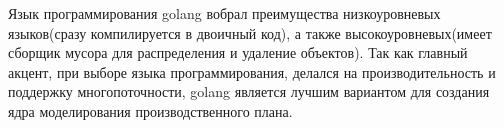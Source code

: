 Язык программирования golang вобрал преимущества низкоуровневых языков(сразу компилируется в двоичный код), а также высокоуровневых(имеет сборщик мусора для распределения и удаление объектов). Так как главный акцент, при выборе языка программирования, делался на производительность и поддержку многопоточности, golang является лучшим вариантом для создания ядра моделирования производственного плана.